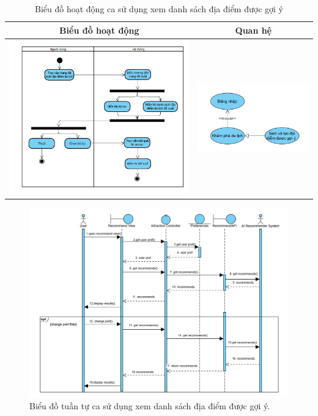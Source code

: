 \begin{table}[H] %
    \centering
    \caption{Biểu đồ hoạt động ca sử dụng xem danh sách địa điểm được gợi ý} %
    \label{tab:uc_view_recommendations_diagrams} %
    \begin{tabular}{| c | c |}
        \hline
        \textbf{Biểu đồ hoạt động} & \textbf{Quan hệ} \\
        \hline
        \includegraphics[width=0.5\linewidth]{figures/c3/3-3-6-ad.png}
        &
        \includegraphics[width=0.45\linewidth]{figures/c3/3-3-6-rd.png} \\
        \hline
    \end{tabular}
\end{table}

\begin{figure}[H]
    \centering
    \includegraphics[width=1\textwidth]{figures/c3/3-3-6-sd.png} %
    \caption{Biểu đồ tuần tự ca sử dụng xem danh sách địa điểm được gợi ý.}
    \label{fig:3-3-6-sequence-diagram}
\end{figure}